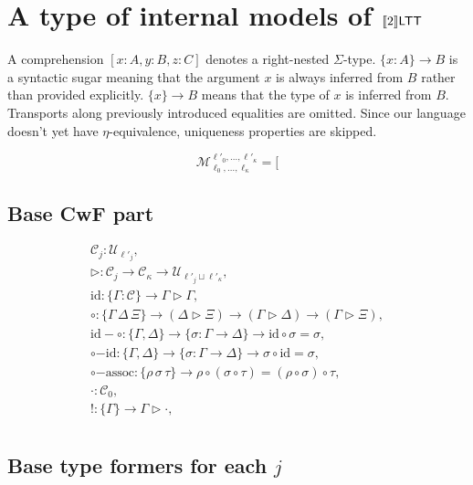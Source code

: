 \section{A type of internal models of
\texorpdfstring{$\llbracket 2\rrbracket\mathsf{LTT}$}{[[2]]LTT}}
\label{twoltt-internal-model-def}

A comprehension $[x:A,y:B,z:C]$ denotes
a right-nested $\Sigma$-type. $\{x:A\}\to B$ is a
syntactic sugar meaning that the argument $x$ is always
inferred from $B$ rather than provided explicitly.
$\{x\}\to B$ means that the type of $x$ is inferred from
$B$. Transports along previously introduced equalities
are omitted. Since our language doesn't yet have
$\eta$-equivalence, uniqueness properties are skipped.

\[\mathcal{M}_{\ell_0,\ldots,\ell_\kappa}^{
    \ell'_0,\ldots,\ell'_\kappa}={[}\]

\subsection{Base CwF part}

\[\begin{array}{l}
    \mathcal{C}_j:\mathcal{U}_{\ell'_j},\\
    \triangleright:\mathcal{C}_j\to\mathcal{C}_\kappa\to
        \mathcal{U}_{\ell'_j\sqcup\ell'_\kappa},\\
    \mathrm{id}:\{\Gamma:\mathcal{C}\}\to
        \Gamma\triangleright\Gamma,\\
    \circ:\{\Gamma\,\Delta\,\Xi\}\to
        (\Delta\triangleright\Xi)\to
        (\Gamma\triangleright\Delta)\to
        (\Gamma\triangleright\Xi),\\
    \mathrm{id-}\circ:\{\Gamma,\Delta\}\to\{
        \sigma:\Gamma\to\Delta\}\to
        \mathrm{id}\circ\sigma=\sigma,\\
    \circ\mathrm{-id}:\{\Gamma,\Delta\}\to\{
        \sigma:\Gamma\to\Delta\}\to
        \sigma\circ\mathrm{id}=\sigma,\\
    \circ\mathrm{-assoc}:\{\rho\,\sigma\,\tau\}\to
        \rho\circ(\sigma\circ\tau)=
        (\rho\circ\sigma)\circ\tau,\\
    \cdot:\mathcal{C}_0,\\
    !:\{\Gamma\}\to\Gamma\triangleright\cdot,\\
\end{array}\]

\subsection{Base type formers for each
\texorpdfstring{$j$}{j}}

